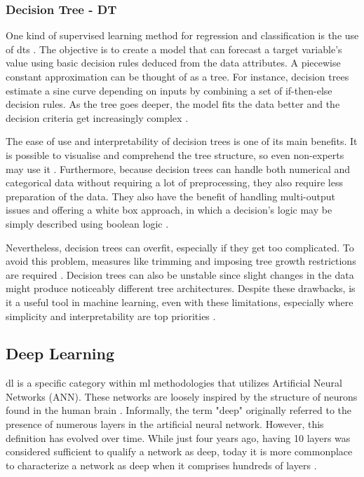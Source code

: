 \subsubsection{Decision Tree - DT}

One kind of supervised learning method for regression and classification is the use of \acfp{dt} \citep{sklearn_dtt}. The objective is to create a model that can forecast a target variable's value using basic decision rules deduced from the data attributes. A piecewise constant approximation can be thought of as a tree. For instance, decision trees estimate a sine curve depending on inputs by combining a set of if-then-else decision rules. As the tree goes deeper, the model fits the data better and the decision criteria get increasingly complex \citep{sklearn_dtt}.

The ease of use and interpretability of decision trees is one of its main benefits. It is possible to visualise and comprehend the tree structure, so even non-experts may use it \citep{sklearn_dtt}. Furthermore, because decision trees can handle both numerical and categorical data without requiring a lot of preprocessing, they also require less preparation of the data. They also have the benefit of handling multi-output issues and offering a white box approach, in which a decision's logic may be simply described using boolean logic \citep{sklearn_dtt}.

Nevertheless, decision trees can overfit, especially if they get too complicated. To avoid this problem, measures like trimming and imposing tree growth restrictions are required \citep{sklearn_dtt}. Decision trees can also be unstable since slight changes in the data might produce noticeably different tree architectures. Despite these drawbacks, is it a useful tool in machine learning, even with these limitations, especially where simplicity and interpretability are top priorities \citep{sklearn_dtt}.


\subsection{Deep Learning}
\ac{dl} is a specific category within \ac{ml} methodologies that utilizes Artificial Neural Networks (ANN). These networks are loosely inspired by the structure of neurons found in the human brain \citep{gulli_deep_2017}. Informally, the term "deep" originally referred to the presence of numerous layers in the artificial neural network. However, this definition has evolved over time. While just four years ago, having 10 layers was considered sufficient to qualify a network as deep, today it is more commonplace to characterize a network as deep when it comprises hundreds of layers \citep{gulli_deep_2017}. 

